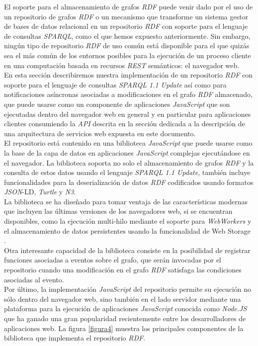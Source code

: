 El soporte para el almacenamiento de grafos \textit{RDF} puede venir dado por el uso de un repositorio de grafos \textit{RDF} o un mecanismo que transforme un sistema gestor de bases de datos relacional en un repositorio \textit{RDF} con soporte para el lenguaje de consultas \textit{SPARQL}, como el que hemos expuesto anteriormente. Sin embargo, ning\'un tipo de repositorio \textit{RDF} de uso com\'un est\'a disponible para el que quiz\'as sea el m\'as com\'un de los entornos posibles para la ejecuci\'on de un proceso cliente en una computaci\'on basada en recursos \textit{REST} sem\'anticos: el navegador web.\\
En esta secci\'on describiremos nuestra implementaci\'on de un repositorio \textit{RDF} con soporte para el lenguaje de consultas \textit{SPARQL 1.1 Update} as\'i como para notificaciones as\'incronas asociadas a modificaciones en el grafo \textit{RDF} almacenado, que puede usarse como un componente de aplicaciones \textit{JavaScript} que son ejecutadas dentro del navegador web en general y en particular para aplicaciones clientes consumiendo la \textit{API} descrita en la secci\'on dedicada a la descripci\'on de una arquitectura de servicios web expuesta en este documento.\\
El repositorio est\'a contenido en una biblioteca \textit{JavaScript} que puede usarse como la base de la capa de datos en aplicaciones \textit{JavaScript} complejas ejecut\'andose en el navegador. La biblioteca soporta no solo el almacenamiento de grafos \textit{RDF} y la consulta de estos datos usando el lenguaje \textit{SPARQL 1.1 Update}, tambi\'en incluye funcionalidades para la deserializaci\'on de datos \textit{RDF} codificados usando formatos \textit{JSON}-LD, \textit{Turtle} y \textit{N3}.\\
La biblioteca se ha dise\~nado para tomar ventaja de las caracter\'isticas modernas que incluyen las \'ultimas versiones de los navegadores web, si se encuentran disponibles, como la ejecuci\'on multi-hilo mediante el soporte para \textit{WebWorkers} \cite{hicksonweb} y el almacenamiento de datos persistentes usando la funcionalidad de Web Storage \cite{webstorage}.\\
Otra interesante capacidad de la biblioteca consiste en la posibilidad de registrar funciones asociadas a eventos sobre el grafo, que ser\'an invocadas por el repositorio cuando una modificaci\'on en el grafo \textit{RDF} satisfaga las condiciones asociadas al evento.\\
Por \'ultimo, la implementaci\'on \textit{JavaScript} del repositorio permite su ejecuci\'on no s\'olo dentro del navegador web, sino tambi\'en en el lado servidor mediante una plataforma para la ejecuci\'on de aplicaciones \textit{JavaScript} conocida como \textit{Node.JS} que ha ganado una gran popularidad recientemente entre los desarrolladores de aplicaciones web. La figura \ref{figura4} muestra los principales componentes de la biblioteca que implementa el repositorio \textit{RDF}.

